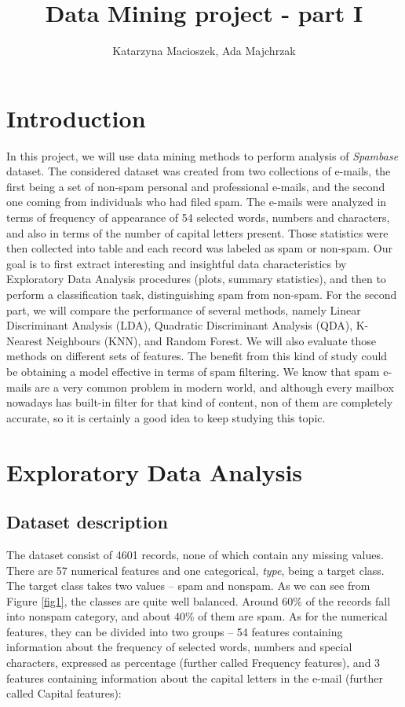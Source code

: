 \documentclass{article}\usepackage[]{graphicx}\usepackage[]{xcolor}
\author{Katarzyna Macioszek, Ada Majchrzak}
\title{Data Mining project - part I}
\begin{document}
\maketitle

\section{Introduction}

In this project, we will use data mining methods to perform analysis of \textit{Spambase}
dataset. The considered dataset was created from two collections of e-mails, 
the first being a set of non-spam personal and professional e-mails, and the 
second one coming from individuals who had filed spam. The e-mails were 
analyzed in terms of frequency of appearance of 54 selected words, numbers and characters,
and also in terms of the number of capital letters present. 
Those statistics were then collected into table and each record was labeled 
as spam or non-spam. Our goal is to first extract interesting and insightful data characteristics
by Exploratory Data Analysis procedures (plots, summary statistics), and then to perform a classification task,
distinguishing spam from non-spam. For the second part, we will compare the performance
of several methods, namely Linear Discriminant Analysis (LDA), Quadratic Discriminant Analysis (QDA),
K-Nearest Neighbours (KNN), and Random Forest. We will also evaluate those methods on different sets of features.
The benefit from this kind of study could be obtaining a model effective in terms 
of spam filtering. We know that spam e-mails are a very common problem in modern 
world, and although every mailbox nowadays has built-in filter for that kind
of content, non of them are completely accurate, so it is certainly a good idea
to keep studying this topic.

\section{Exploratory Data Analysis}



\subsection*{Dataset description}

The dataset consist of 4601 records, none of which contain any missing values.
There are 57 numerical features and one categorical, \textit{type}, being a target class.
The target class takes two values -- spam and nonspam. As we can see from Figure \ref{fig1},
the classes are quite well balanced. Around 60\% of the records fall into nonspam category,
and about 40\% of them are spam. As for the numerical features, they can be divided into two
groups -- 54 features containing information about the frequency of selected words, numbers and 
special characters, expressed as percentage (further called Frequency features), 
and 3 features containing information about the capital letters in the e-mail (further called Capital features):
\end{document}

